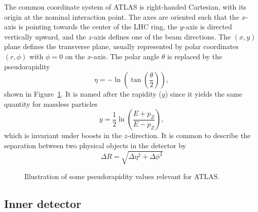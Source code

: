 The common coordinate system of ATLAS is right-handed Cartesian, 
with its origin at the nominal interaction point. 
The axes are oriented such that the $x$-axis is pointing towards the center of the LHC ring, the $y$-axis is directed
vertically upward, and the $z$-axis defines one of the beam directions.
The $(x, y)$ plane defines the transverse plane, usually represented by polar coordinates $(r,\phi)$
with $\phi=0$ on the $x$-axis.
The polar angle $\theta$ is replaced by the pseudorapidity
\begin{equation}
\eta = - \ln\left(\tan\left(\frac{\theta}{2}\right)\right),
\end{equation}
shown in Figure~\ref{fig:exp.atlas.pseudo}.
It is named after the rapidity ($y$) since it yields the same quantity for massless particles
\begin{equation}
y = \frac{1}{2}\ln\left(\frac{E+p_Z}{E-p_Z}\right),
\end{equation}
which is invariant under boosts in the $z$-direction.
It is common to describe the separation between two physical objects in the detector by 
\begin{equation}
\Delta R = \sqrt{\Delta \eta^2 + \Delta \phi^2}
\end{equation}

\begin{figure}[htb!]
\centering
{}
\caption{Illustration of some pseudorapidity values relevant for ATLAS.}
\label{fig:exp.atlas.pseudo}
\end{figure} 

\subsection{Inner detector}

